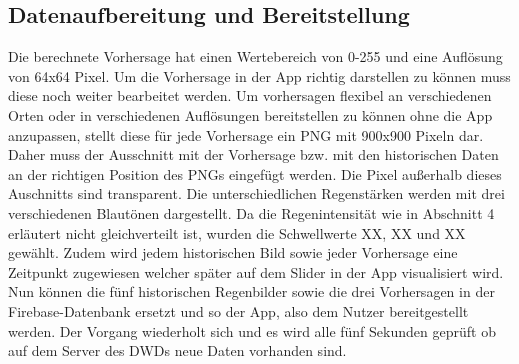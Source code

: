 \subsection{Datenaufbereitung und Bereitstellung}
Die berechnete Vorhersage hat einen Wertebereich von 0-255 und eine Auflösung von 64x64 Pixel.
Um die Vorhersage in der App richtig darstellen zu können muss diese noch weiter bearbeitet werden.
Um vorhersagen flexibel an verschiedenen Orten oder in verschiedenen Auflösungen bereitstellen zu können ohne die App anzupassen, stellt diese für jede Vorhersage ein PNG mit 900x900 Pixeln dar.
Daher muss der Ausschnitt mit der Vorhersage bzw. mit den historischen Daten an der richtigen Position des PNGs eingefügt werden.
Die Pixel außerhalb dieses Auschnitts sind transparent.
Die unterschiedlichen Regenstärken werden mit drei verschiedenen Blautönen dargestellt.
Da die Regenintensität wie in Abschnitt 4 erläutert nicht gleichverteilt ist, wurden die Schwellwerte XX, XX und XX gewählt. 
Zudem wird jedem historischen Bild sowie jeder Vorhersage eine Zeitpunkt zugewiesen welcher später auf dem Slider in der App visualisiert wird.
Nun können die fünf historischen Regenbilder sowie die drei Vorhersagen in der Firebase-Datenbank ersetzt und so der App, also dem Nutzer bereitgestellt werden. 
Der Vorgang wiederholt sich und es wird alle fünf Sekunden geprüft ob auf dem Server des DWDs neue Daten vorhanden sind. 

